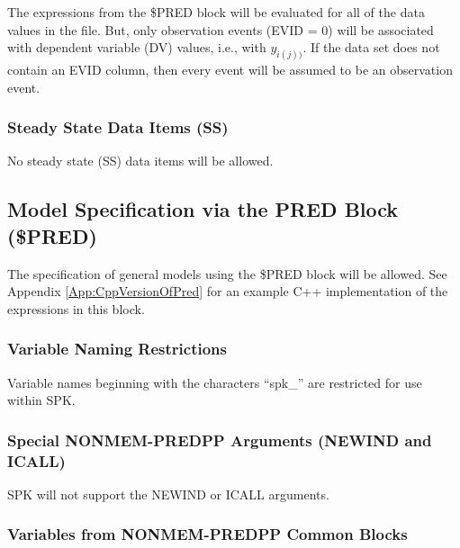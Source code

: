 \documentclass{article}
\begin{document}
The expressions from the \$PRED block will be evaluated for all
of the data values in the file.
But, only observation events (EVID = 0) will be associated
with dependent variable (DV) values, i.e., with $y_{i(j))}$.
If the data set does not contain an EVID column, then every
event will be assumed to be an observation event.


\subsubsection{Steady State Data Items (SS)}

No steady state (SS) data items will be allowed.


\subsection{Model Specification via the PRED Block (\$PRED)}

The specification of general models using the \$PRED block will
be allowed.
See Appendix \ref{App:CppVersionOfPred} for an example C++ 
implementation of the expressions in this block.


\subsubsection{Variable Naming Restrictions}

Variable names beginning with the characters ``spk\_'' are restricted
for use within SPK.


\subsubsection{Special NONMEM-PREDPP Arguments (NEWIND and ICALL)}

SPK will not support the NEWIND or ICALL arguments.


\subsubsection{Variables from NONMEM-PREDPP Common Blocks}
\end{document}
